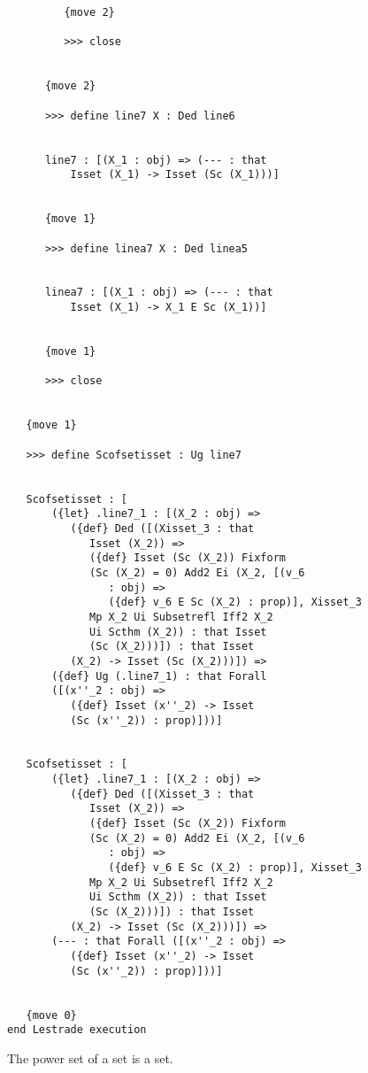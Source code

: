 \documentclass[12pt]{article}
\begin{document}
\begin{verbatim}
         {move 2}

         >>> close


      {move 2}

      >>> define line7 X : Ded line6


      line7 : [(X_1 : obj) => (--- : that 
          Isset (X_1) -> Isset (Sc (X_1)))]


      {move 1}

      >>> define linea7 X : Ded linea5


      linea7 : [(X_1 : obj) => (--- : that 
          Isset (X_1) -> X_1 E Sc (X_1))]


      {move 1}

      >>> close


   {move 1}

   >>> define Scofsetisset : Ug line7


   Scofsetisset : [
       ({let} .line7_1 : [(X_2 : obj) => 
          ({def} Ded ([(Xisset_3 : that 
             Isset (X_2)) => 
             ({def} Isset (Sc (X_2)) Fixform 
             (Sc (X_2) = 0) Add2 Ei (X_2, [(v_6 
                : obj) => 
                ({def} v_6 E Sc (X_2) : prop)], Xisset_3 
             Mp X_2 Ui Subsetrefl Iff2 X_2 
             Ui Scthm (X_2)) : that Isset 
             (Sc (X_2)))]) : that Isset 
          (X_2) -> Isset (Sc (X_2)))]) => 
       ({def} Ug (.line7_1) : that Forall 
       ([(x''_2 : obj) => 
          ({def} Isset (x''_2) -> Isset 
          (Sc (x''_2)) : prop)]))]


   Scofsetisset : [
       ({let} .line7_1 : [(X_2 : obj) => 
          ({def} Ded ([(Xisset_3 : that 
             Isset (X_2)) => 
             ({def} Isset (Sc (X_2)) Fixform 
             (Sc (X_2) = 0) Add2 Ei (X_2, [(v_6 
                : obj) => 
                ({def} v_6 E Sc (X_2) : prop)], Xisset_3 
             Mp X_2 Ui Subsetrefl Iff2 X_2 
             Ui Scthm (X_2)) : that Isset 
             (Sc (X_2)))]) : that Isset 
          (X_2) -> Isset (Sc (X_2)))]) => 
       (--- : that Forall ([(x''_2 : obj) => 
          ({def} Isset (x''_2) -> Isset 
          (Sc (x''_2)) : prop)]))]


   {move 0}
end Lestrade execution
\end{verbatim}

The power set of a set is a set.
\end{document}
